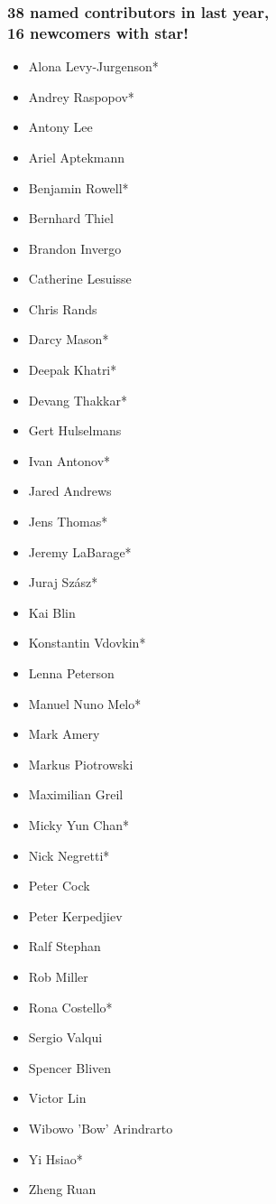 \begin{frame}
  \frametitle{38 named contributors in last year, \\ 16 newcomers with star!}
  \scriptsize{
  \begin{multicols}{3}
  \begin{itemize}
    \item Alona Levy-Jurgenson*
    \item Andrey Raspopov*
    \item Antony Lee
    \item Ariel Aptekmann
    \item Benjamin Rowell*
    \item Bernhard Thiel
    \item Brandon Invergo
    \item Catherine Lesuisse
    \item Chris Rands
    \item Darcy Mason*
    \item Deepak Khatri*
    \item Devang Thakkar*
    \item Gert Hulselmans
    \item Ivan Antonov*
    \item Jared Andrews
    \item Jens Thomas*
    \item Jeremy LaBarage*
    \item Juraj Szász*
    \item Kai Blin
    \item Konstantin Vdovkin*
    \item Lenna Peterson
    \item Manuel Nuno Melo*
    \item Mark Amery
    \item Markus Piotrowski
    \item Maximilian Greil
    \item Micky Yun Chan*
    \item Nick Negretti*
    \item Peter Cock
    \item Peter Kerpedjiev
    \item Ralf Stephan
    \item Rob Miller
    \item Rona Costello*
    \item Sergio Valqui
    \item Spencer Bliven
    \item Victor Lin
    \item Wibowo 'Bow' Arindrarto
    \item Yi Hsiao*
    \item Zheng Ruan
  \end{itemize}
  \end{multicols}
  }
\end{frame}


